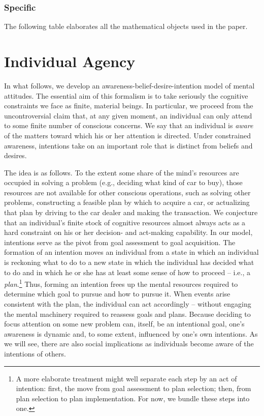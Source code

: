 \documentclass[
11pt,
titlepage,
reqno,
]{article}%
\theoremstyle{definition}
\begin{document}
	\subsubsection{Specific}
	The following table elaborates all the mathematical objects used in the paper.

	
	
	
	\section{Individual Agency}\label{sec:individuals}

	In what follows, we develop an awareness-belief-desire-intention model of mental attitudes. 
	The essential aim of this formalism is to take seriously the cognitive constraints we face as finite, material beings.
	In particular, we proceed from the uncontroversial claim that, at any given moment, an individual can only  attend to some finite number of conscious concerns. 
	We say that an individual is \textit{aware} of the matters toward which his or her attention is directed.
	Under constrained awareness, intentions take on an important role that is distinct from beliefs and desires.
	
	The idea is as follows.
	To the extent some share of the mind's resources are occupied in solving a problem (e.g., deciding what kind of car to buy), those resources are not available for other conscious operations, such as solving other problems, constructing a feasible plan by which to acquire a car, or actualizing that plan by driving to the car dealer and making the transaction.
	We conjecture that an individual's finite stock of cognitive resources almost always acts as a hard constraint on his or her decision- and act-making capability.
	In our model, intentions serve as the pivot from goal assessment to goal acquisition.
	The formation of an intention moves an individual from a state in which an individual is reckoning what to do to a new state in which the individual has decided what to do and in which he or she has at least some sense of how to proceed -- i.e., a \textit{plan}.\footnote
	{
		A more elaborate treatment might well separate each step by an act of intention: first, the move from goal assessment to plan selection; then, from plan selection to plan implementation. For now, we bundle these steps into one.
	}
	Thus, forming an intention frees up the mental resources required to determine which goal to pursue and how to pursue it.
	When events arise consistent with the plan, the individual can act accordingly -- without engaging the mental machinery required to reassess goals and plans.
	Because deciding to focus attention on some new problem can, itself, be an intentional goal, one's awareness is dynamic and, to some extent, influenced by one's own intentions.
	As we will see, there are also social implications as individuals become aware of the intentions of others.  
\end{document}
